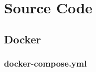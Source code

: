 %
\begin{appendices}
\label{ch:appendix}

\chapter{Source Code}
\label{ch:appendix:source}

\section{Docker}

\subsection{docker-compose.yml}



\end{appendices}